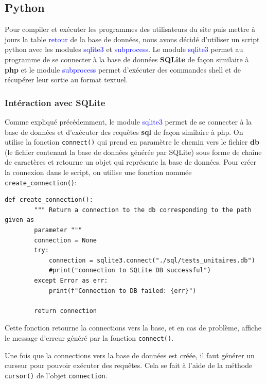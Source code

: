 \documentclass[a4paper]{article}
\renewcommand{\texttt}[2][blue]{\textcolor{#1}{\ttfamily #2}}
\begin{document}
  \subsection{Python}%
  \label{sec:Python}

  Pour compiler et exécuter les programmes des utilisateurs du site puis mettre à
  jours la table \texttt{retour} de la base de données, nous avons décidé
  d'utiliser un script python avec les modules \texttt{sqlite3} et
  \texttt{subprocess}. Le module \texttt{sqlite3} permet au programme de se
  connecter à la base de données \textbf{SQLite} de façon similaire à
  \textbf{php} et le module \texttt{subprocess} permet d'exécuter des commandes
  shell et de récupérer leur sortie au format textuel.

  \subsubsection{Intéraction avec SQLite}%
  \label{sub:Intéraction avec SQLite}

  Comme expliqué précédemment, le module \texttt{sqlite3} permet de se
  connecter à la base de données et d'exécuter des requêtes \textbf{sql} de
  façon similaire à php. On utilise la fonction \lstinline{connect()} qui prend
  en paramètre le chemin vers le fichier \textbf{db} (le fichier contenant la
  base de données générée par SQLite) sous forme de chaîne de caractères et
  retourne un objet qui représente la base de données. Pour créer la connexion
  dans le script, on utilise une fonction nommée
  \lstinline{create_connection()}:

  \begin{lstlisting}[language=PY]%
    def create_connection():
        """ Return a connection to the db corresponding to the path given as
        parameter """
        connection = None
        try:
            connection = sqlite3.connect("./sql/tests_unitaires.db")
            #print("connection to SQLite DB successful")
        except Error as err:
            print(f"Connection to DB failed: {err}")

        return connection
  \end{lstlisting}

  Cette fonction retourne la connections vers la base, et en cas de problème,
  affiche le message d'erreur généré par la fonction \lstinline{connect()}.

  Une fois que la connections vers la base de données est créée, il faut générer
  un curseur pour pouvoir exécuter des requêtes. Cela se fait à l'aide de la
  méthode \lstinline{cursor()} de l'objet \lstinline{connection}.
\end{document}
